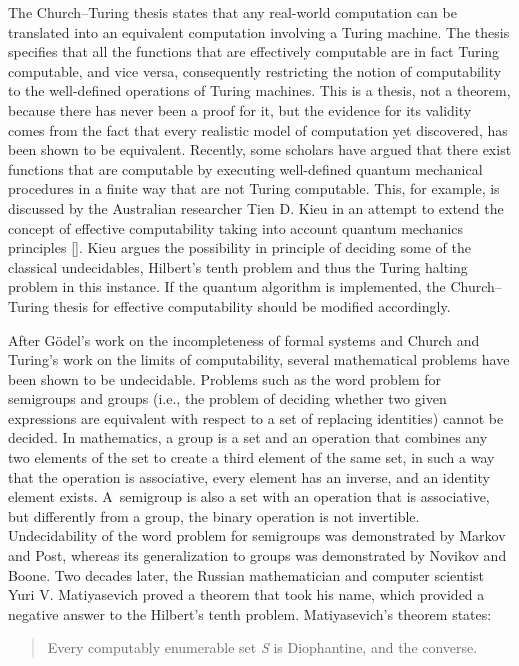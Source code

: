 The Church--Turing thesis states that any real-world computation can be translated into an equivalent computation involving a Turing machine. The thesis \hbox{specifies} that all the functions that are effectively computable are in fact Turing computable, and vice versa, consequently restricting the notion of computability to the well-defined operations of Turing machines. This is a thesis, not a theorem, because there has never been a proof for it, but the evidence for its validity comes from the fact that every realistic model of computation yet discovered, has been shown to be equivalent. Recently, some scholars have argued that there exist functions that are computable by executing well-defined quantum mechanical procedures in a finite way that are not Turing computable. This, for example, is discussed by the Australian researcher Tien D. Kieu in an attempt to extend the concept of effective computability taking into account quantum mechanics principles [\citealt{chap:11:Kieu:2003}]. Kieu argues the possibility in principle of deciding some of the classical undecidables, Hilbert's tenth problem and thus the Turing halting problem in this instance. If the quantum algorithm is implemented, the Church--Turing thesis for effective computability should be modified accordingly.

After G\"{o}del's work on the incompleteness of formal systems and Church and Turing's work on the limits of computability, several mathematical problems have been shown to be undecidable. Problems such as the word problem for semigroups and groups (i.e., the problem of deciding whether two given expressions are equivalent with respect to a set of replacing identities) cannot be decided. In mathematics, a group is a set and an operation that combines any two elements of the set to create a third element of the same set, in such a way that the operation is associative, every element has an inverse, and an identity element exists. \hbox{A semigroup} is also a set with an operation that is associative, but differently from a group, the binary operation is not invertible. Undecidability of the word problem for semigroups was demonstrated by Markov and Post, whereas its generalization to groups was demonstrated by Novikov and Boone. Two decades later, the Russian mathematician and computer scientist Yuri V. Matiyasevich proved a theorem that took his name, which provided a negative answer to the Hilbert's tenth problem. Matiyasevich's theorem states:

\begin{quote}
Every computably enumerable set \textit{S} is Diophantine, and the converse.
\end{quote}

